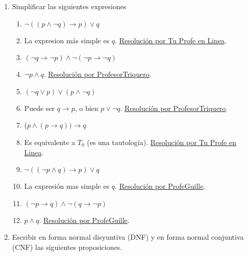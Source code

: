\documentclass[a4paper]{article}
\newcommand{\answer}{\item[**]}
\newcommand{\exercise}{\item}
\newcommand{\then}{\to}
\newcommand{\Eq}{\Leftrightarrow}
\begin{document}
\begin{enumerate}
\begin{multicols}{2}
\begin{enumerate} [label=(\alph*)]
		\item $p\lor q \then  r	\Eq (p\then r) \land  (q\then r)$
		\answer La \href{https://www.wolframalpha.com/input?i=%28%28p+or+q+%29+%3D%3E++r%29+%3C%3D%3E+%28+%28p+%3D%3E+r%29+and+%28q+%3D%3E+r%29+%29}{tabla de verdad} revela que es una tautología. Por lo tanto, son equivalentes. Esta regla de equivalencia se llama Demostración por casos.

	\end{enumerate}
	\end{multicols}

	\exercise Simplificar las siguientes expresiones
	\begin{multicols}{2}
	\begin{enumerate} [label=(\alph*)]

		\item $\neg ((p \land \neg q)\then p) \lor q$
		\answer La expresion más simple es $q$. \href{https://youtu.be/BOydu7cpv70}{Resolución por Tu Profe en Linea}.

		\item $(\neg q \then \neg p) \land \neg (\neg p \then \neg q)$
		\answer $\neg p \land q$. \href{https://youtu.be/p005yi28rgk?t=737}{Resolución por ProfesorTriquero}.

		\item $(\neg q \lor p) \lor (p \land \neg q)$
		\answer Puede ser $q \then p$, o bien $p \lor \neg q$. \href{https://youtu.be/p005yi28rgk?t=995}{Resolución por ProfesorTriquero}.

		\item ($p \land ( p \then q)) \then q$
		\answer Es equivalente a $T_0$ (es una tautología). \href{https://youtu.be/BOydu7cpv70?t=586}{Resolución por Tu Profe en Linea}.

		\item $\neg ((\neg p \land q) \then p) \lor q$
		\answer La expresión mas simple es $q$. \href{https://youtu.be/KyIdCTWZuJ8}{Resolución por ProfeGuille}.

		\item $(\neg p \then q) \land \neg (q \then \neg p)$
		\answer $p \land q$. \href{https://youtu.be/shOOoVRqKcA}{Resolución por ProfeGuille}.

	\end{enumerate}
	\end{multicols}

	\exercise Escribir en forma normal disyuntiva (DNF) y en forma normal conjuntiva (CNF) las siguientes proposiciones.
	\begin{multicols}{2}
	\begin{enumerate} [label=(\alph*)]


\end{enumerate}
\end{multicols}
\end{enumerate}
\end{document}
